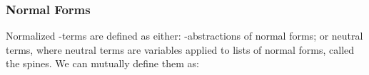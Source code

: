 {\subsubsection*{Normal Forms}

Normalized \lambda-terms are defined as either: \lambda-abstractions of normal forms; or neutral terms, where neutral terms are variables applied to lists of normal forms, called the spines. We can mutually define them as:

\begin{code}[hide]%
\>[0]\<%
\end{code}

\begin{code}%
\>[0][@{}l@{\AgdaIndent{1}}]%
\>[2]\AgdaSpace{}%
\AgdaSpace{}%
\AgdaSymbol{:}\AgdaSpace{}%
\AgdaSpace{}%
\AgdaSpace{}%
\AgdaSpace{}%
\AgdaSpace{}%
\AgdaSpace{}%
\<%
\\
\>[2][@{}l@{\AgdaIndent{0}}]%
\>[4]\AgdaSpace{}%
\AgdaSymbol{:}\AgdaSpace{}%
\AgdaSpace{}%
\AgdaSymbol{(}\AgdaSpace{}%
\AgdaSpace{}%
\AgdaSymbol{)}\AgdaSpace{}%
\AgdaSpace{}%
\AgdaSpace{}%
\AgdaSpace{}%
\AgdaSpace{}%
\AgdaSymbol{(}\AgdaSpace{}%
\AgdaSpace{}%
\AgdaSymbol{)}\<%
\\
%
\>[4]%
\>[8]\AgdaSymbol{:}\AgdaSpace{}%
\AgdaSpace{}%
\AgdaSpace{}%
\AgdaInductiveConstructor{*}\AgdaSpace{}%
\AgdaSpace{}%
\AgdaSpace{}%
\AgdaSpace{}%
\AgdaInductiveConstructor{*}\<%
\\
%
\\[\AgdaEmptyExtraSkip]%
%
\>[2]\AgdaSpace{}%
\AgdaSpace{}%
\AgdaSymbol{:}\AgdaSpace{}%
\AgdaSpace{}%
\AgdaSpace{}%
\AgdaSpace{}%
\AgdaSpace{}%
\AgdaSpace{}%
\<%
\\
\>[2][@{}l@{\AgdaIndent{0}}]%
\>[4]\AgdaOperator{\AgdaInductiveConstructor{\AgdaUnderscore{},\AgdaUnderscore{}}}\AgdaSpace{}%
\AgdaSymbol{:}\AgdaSpace{}%
\AgdaSpace{}%

\end{code}}
